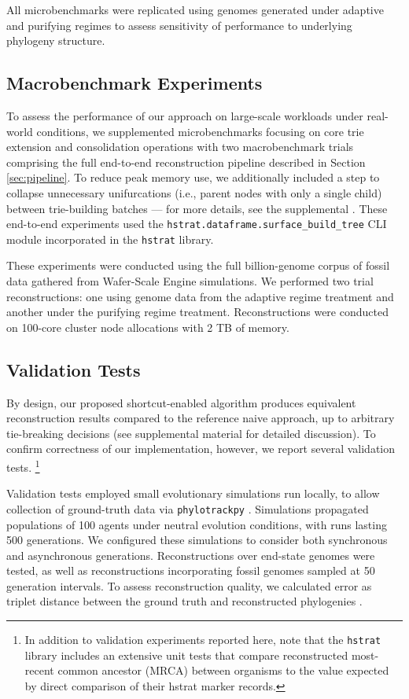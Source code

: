 All microbenchmarks were replicated using genomes generated under adaptive and purifying regimes to assess sensitivity of performance to underlying phylogeny structure.

\subsection{Macrobenchmark Experiments}

To assess the performance of our approach on large-scale workloads under real-world conditions, we supplemented microbenchmarks focusing on core trie extension and consolidation operations with two macrobenchmark trials comprising the full end-to-end reconstruction pipeline described in Section \ref{sec:pipeline}.
To reduce peak memory use, we additionally included a step to collapse unnecessary unifurcations (i.e., parent nodes with only a single child) between trie-building batches --- for more details, see the supplemental \citep{supplemental}.
These end-to-end experiments used the \texttt{hstrat.dataframe.surface\_build\_tree} CLI module incorporated in the \texttt{hstrat} library.

These experiments were conducted using the full billion-genome corpus of fossil data gathered from Wafer-Scale Engine simulations.
We performed two trial reconstructions: one using genome data from the adaptive regime treatment and another under the purifying regime treatment.
Reconstructions were conducted on 100-core cluster node allocations with 2 TB of memory.

\subsection{Validation Tests}

By design, our proposed shortcut-enabled algorithm produces equivalent reconstruction results compared to the reference naive approach, up to arbitrary tie-breaking decisions (see supplemental material \citep{supplemental} for detailed discussion).
To confirm correctness of our implementation, however, we report several validation tests.%
\footnote{In addition to validation experiments reported here, note that the \texttt{hstrat} library includes an extensive unit tests that compare reconstructed most-recent common ancestor (MRCA) between organisms to the value expected by direct comparison of their hstrat marker records.}

Validation tests employed small evolutionary simulations run locally, to allow collection of ground-truth data via \texttt{phylotrackpy} \citep{dolson2024phylotrack}.
Simulations propagated populations of 100 agents under neutral evolution conditions, with runs lasting 500 generations.
We configured these simulations to consider both synchronous and asynchronous generations.
Reconstructions over end-state genomes were tested, as well as reconstructions incorporating fossil genomes sampled at 50 generation intervals.
To assess reconstruction quality, we calculated error as triplet distance between the ground truth and reconstructed phylogenies \citep{critchlow1996triples}.

